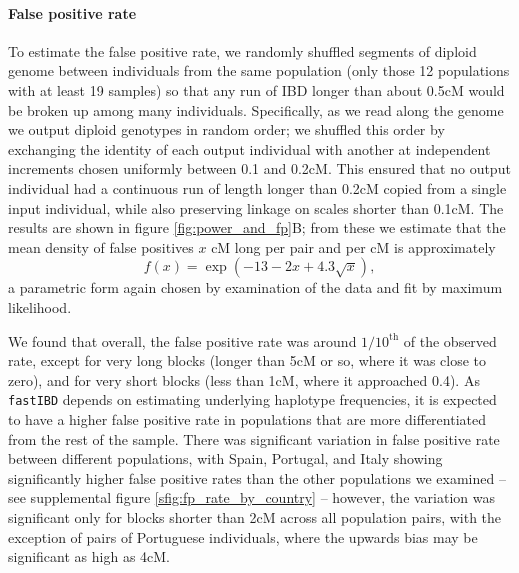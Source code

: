 \documentclass{article}
\begin{document}
\paragraph{False positive rate}
To estimate the false positive rate, 
we randomly shuffled segments of diploid genome between individuals from the same population
(only those 12 populations with at least 19 samples)
so that any run of IBD longer than about 0.5cM would be broken up among many individuals.
Specifically, as we read along the genome we output diploid genotypes in random order;
we shuffled this order by exchanging the identity of each output individual with another
at independent increments chosen uniformly between 0.1 and 0.2cM.
This ensured that no output individual had a continuous run of length longer than 0.2cM copied from a single input individual,
while also preserving linkage on scales shorter than 0.1cM.
The results are shown in figure \ref{fig:power_and_fp}B;
from these we estimate that the mean density of false positives $x$ cM long per pair and per cM
is approximately 
\begin{equation} \label{eqn:fp}
  f(x) = \exp(-13-2x +4.3 \sqrt{x}), 
\end{equation}
a parametric form again chosen by examination of the data and fit by maximum likelihood.

We found that overall, the false positive rate was around $1/10^\mathrm{th}$ of the observed rate,
except for very long blocks (longer than 5cM or so, where it was close to zero),
and for very short blocks (less than 1cM, where it approached 0.4).
As {\tt fastIBD} depends on estimating underlying haplotype frequencies,
it is expected to have a higher false positive rate in populations that are more differentiated from the rest of the sample.
There was significant variation in false positive rate between different populations,
with Spain, Portugal, and Italy showing significantly higher false positive rates than the other populations we examined
-- see supplemental figure \ref{sfig:fp_rate_by_country} -- 
however, the variation was significant only for blocks shorter than 2cM
across all population pairs, with the exception of pairs of Portuguese individuals,
where the upwards bias may be significant as high as 4cM.
\end{document}
